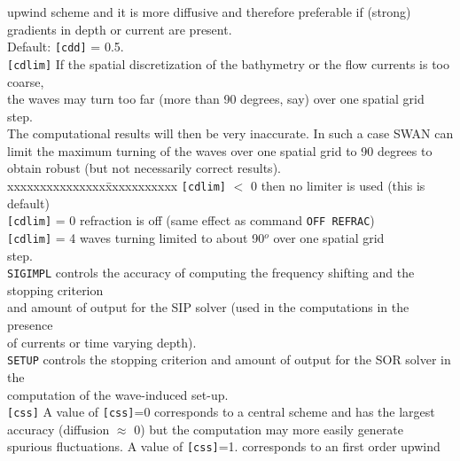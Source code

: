 \documentclass[12pt]{book}
\begin{document}
\begin{tabbing}
                  upwind scheme and it is more diffusive and therefore preferable if (strong)\\
                  gradients in depth or current are present.\\
                  Default: {\tt [cdd]} = 0.5.\-\\
{\tt [cdlim]}  \> If the spatial discretization of the bathymetry or the flow currents is too coarse,\+\\
                  the waves may turn too far (more than 90 degrees, say) over one spatial grid step.\\
                  The computational results will then be very inaccurate. In such a case SWAN can\\
                  limit the maximum turning of the waves over one spatial grid to 90 degrees to\\
                  obtain robust (but not necessarily correct results).\\
                  \pushtabs
                  xxxxxxxxxxxxxxx\=xxxxxxxxxxx \kill
                  {\tt [cdlim]} $<$ 0 \> then no limiter is used (this is default)\\
                  {\tt [cdlim]} = 0   \> refraction is off (same effect as command {\tt OFF REFRAC})\\
                  {\tt [cdlim]} = 4   \> waves turning limited to about 90$^o$ over one spatial grid\+\\
                                         step.\-\-\\
                  \poptabs
{\tt SIGIMPL}  \> controls the accuracy of computing the frequency shifting and the stopping criterion\+\\
                  and amount of output for the SIP solver (used in the computations in the presence\\
                  of currents or time varying depth).\-\\
{\tt SETUP}    \> controls the stopping criterion and amount of output for the SOR solver in the\+\\
                  computation of the wave-induced set-up.\-\\
{\tt [css]}    \> A value of {\tt [css]}=0 corresponds to a central scheme and has the largest\+\\
                  accuracy (diffusion $\approx$ 0) but the computation may more easily generate\\
                  spurious fluctuations. A value of {\tt [css]}=1. corresponds to an first order upwind\\

\end{tabbing}
\end{document}
